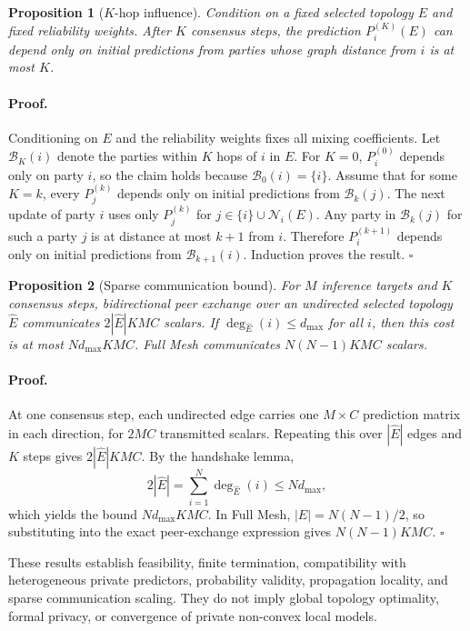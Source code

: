 \documentclass[letterpaper]{article}
\newcommand{\Ni}{\mathcal{N}_i}
\newtheorem{proposition}{Proposition}
\begin{document}
\begin{proposition}[$K$-hop influence]
Condition on a fixed selected topology $E$ and fixed reliability weights. After
$K$ consensus steps, the prediction $P_i^{(K)}(E)$ can depend only on initial
predictions from parties whose graph distance from $i$ is at most $K$.
\end{proposition}

\paragraph{Proof.}
Conditioning on $E$ and the reliability weights fixes all mixing coefficients.
Let $\mathcal{B}_K(i)$ denote the parties within $K$ hops of $i$ in $E$. For
$K=0$, $P_i^{(0)}$ depends only on party $i$, so the claim holds because
$\mathcal{B}_0(i)=\{i\}$. Assume that for some $K=k$, every
$P_j^{(k)}$ depends only on initial predictions from $\mathcal{B}_k(j)$. The
next update of party $i$ uses only $P_j^{(k)}$ for
$j\in\{i\}\cup\Ni(E)$. Any party in $\mathcal{B}_k(j)$ for such a party $j$ is
at distance at most $k+1$ from $i$. Therefore $P_i^{(k+1)}$ depends only on
initial predictions from $\mathcal{B}_{k+1}(i)$. Induction proves the result.
\hfill$\square$

\begin{proposition}[Sparse communication bound]
For $M$ inference targets and $K$ consensus steps, bidirectional peer exchange
over an undirected selected topology $\widehat E$ communicates
$2|\widehat E|KMC$ scalars. If $\deg_{\widehat E}(i)\le d_{\max}$ for all $i$, then
this cost is at most $Nd_{\max}KMC$. Full Mesh communicates
$N(N-1)KMC$ scalars.
\end{proposition}

\paragraph{Proof.}
At one consensus step, each undirected edge carries one $M\times C$ prediction
matrix in each direction, for $2MC$ transmitted scalars. Repeating this over
$|\widehat E|$ edges and $K$ steps gives $2|\widehat E|KMC$. By the handshake lemma,
\[
2|\widehat E|=\sum_{i=1}^{N}\deg_{\widehat E}(i)\le Nd_{\max},
\]
which yields the bound $Nd_{\max}KMC$. In Full Mesh,
$|E|=N(N-1)/2$, so substituting into the exact peer-exchange expression gives
$N(N-1)KMC$. \hfill$\square$

These results establish feasibility, finite termination, compatibility with
heterogeneous private predictors, probability validity, propagation locality,
and sparse communication scaling. They do not imply global topology optimality,
formal privacy, or convergence of private non-convex local models.
\end{document}
